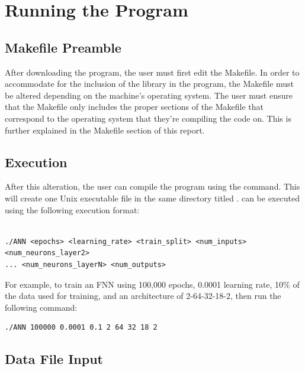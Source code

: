 \documentclass[12pt]{article}
\begin{document}
\section{Running the Program}

\subsection{Makefile Preamble}

After downloading the program, the user must first edit the Makefile. In order to accommodate for the inclusion of the  library in the program, the Makefile must be altered depending on the machine’s operating system. The user must ensure that the Makefile only includes the proper sections of the Makefile that correspond to the operating system that they’re compiling the code on. This is further explained in the Makefile section of this report.

\subsection{Execution}

After this alteration, the user can compile the program using the  command. This will create one Unix executable file in the same directory titled .  can be executed using the following execution format:

 	\begin{mdframed}[style=myboxstyleTerminal1]
		\begin{verbatim}
  
./ANN <epochs> <learning_rate> <train_split> <num_inputs> <num_neurons_layer2> 
... <num_neurons_layerN> <num_outputs>
		\end{verbatim}
	\end{mdframed}
 
 For example, to train an FNN using 100,000 epochs, 0.0001 learning rate, 10\% of the data used for training, and an architecture of 2-64-32-18-2, then run the following command:

 	\begin{mdframed}[style=myboxstyleTerminal1]
		\begin{verbatim}
./ANN 100000 0.0001 0.1 2 64 32 18 2
		\end{verbatim}
	\end{mdframed}

\subsection{Data File Input}
\end{document}

